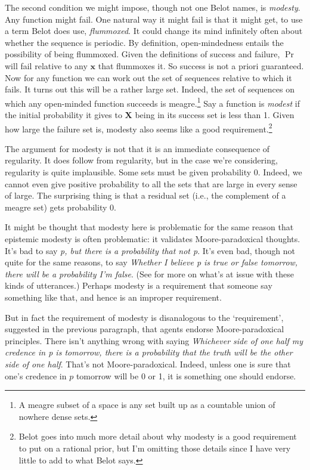 \documentclass{ergoclass}
\newcommand{\vx}{\boldsymbol{x}}
\newcommand{\vX}{\boldsymbol{X}}
\begin{document}
The second condition we might impose, though not one Belot names, is \textit{modesty}. Any function might fail. One natural way it might fail is that it might get, to use a term Belot does use, \textit{flummoxed}. It could change its mind infinitely often about whether the sequence is periodic. By definition, open-mindedness entails the possibility of being flummoxed. Given the definitions of success and failure, $\Pr$ will fail relative to any $\vx$ that flummoxes it. So success is not a priori guaranteed. Now for any function we can work out the set of sequences relative to which it fails. It turns out this will be a rather large set. Indeed, the set of sequences on which any open-minded function succeeds is meagre.\footnote{A meagre subset of a space is any set built up as a countable union of nowhere dense sets.} Say a function is \textit{modest} if the initial probability it gives to $\vX$ being in its success set is less than 1. Given how large the failure set is, modesty also seems like a good requirement.\footnote{Belot goes into much more detail about why modesty is a good requirement to put on a rational prior, but I'm omitting those details since I have very little to add to what Belot says.}

The argument for modesty is not that it is an immediate consequence of regularity. It does follow from regularity, but in the case we're considering, regularity is quite implausible. Some sets must be given probability 0. Indeed, we cannot even give positive probability to all the sets that are large in 
every %
sense of large. The surprising thing is that a residual set (i.e., the complement of a meagre set) gets probability 0. 

It might be thought that modesty here is problematic for the same reason that epistemic modesty is often problematic: it validates Moore-paradoxical thoughts. It's bad to say \textit{p, but there is a probability that not p}. It's even bad, though not quite for the same reasons, to say \textit{Whether I believe p is true or false tomorrow, there will be a probability I'm false}. 
(See\citealt{Briggs2009} %
for more on what's at issue with these kinds of utterances.) Perhaps modesty is a requirement that someone say something like that, and hence is an improper requirement.

But in fact the requirement of modesty is disanalogous to the `requirement', suggested in the previous paragraph, that agents endorse Moore-paradoxical principles. There isn't anything wrong with saying \textit{Whichever side of one half my credence in p is tomorrow, there is a probability that the truth will be the other side of one half}. That's not Moore-paradoxical. Indeed, unless one is sure that one's credence in $p$ tomorrow will be 0 or 1, it is something one should endorse. 
\end{document}
